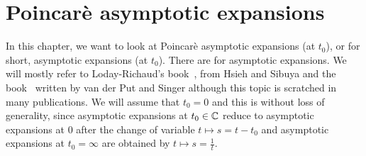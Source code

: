\chapter{Poincarè asymptotic expansions}
\begin{comment}
  \begin{multicols}{2}
    ´classical'
    \begin{itemize}
      \item \cite[60]{sabbah_cimpa90} Chapter II.2.2
        \begin{itemize}
          \item \cite{sabbah2000equations}
        \end{itemize}
      \item \textbf{\textcolor{blue}{Van der Put:
        \cite[Chapter 7]{van2003galois}: Exact Asymptotics}}
      \item \cite{majima1984asymptotic}
      \item \cite[Sec.4.4]{Balser2000Formal}
      \item \cite{Loday1994}
      \item \textbf{\textcolor{blue}{\cite{Loday2014} Chapter 2}}
      \item \cite{hsieh2012basic}
    \end{itemize}
    \columnbreak
    ´sheafical'
    \begin{itemize}
      \item \textbf{\textcolor{red}{\cite[II.5]{sabbah2007isomonodromic}}}
    \end{itemize}
  \end{multicols}
  \TODO[\cite{sibuya1990Linear} Appendix A.3]
\end{comment}
In this chapter, we want to look at Poincarè asymptotic expansions (at $t_0$),
or for short, asymptotic expansions (at $t_0$).
There are  for asymptotic expansions.
We will mostly refer to Loday-Richaud's book~\cite[chapter 2]{Loday2014},
\cite[XI-1-13]{hsieh2012basic} from Hsieh and Sibuya and the
book~\cite[chapter 7]{van2003galois} written by van der Put and Singer although
this topic is scratched in many publications.
We will assume that $t_0=0$ and this is without loss of generality, since
asymptotic expansions at $t_0\in\mathbb{C}$ reduce to asymptotic expansions at $0$
after the change of variable $t\mapsto s=t-t_0$ and asymptotic expansions at
$t_0=\infty$ are obtained by $t\mapsto s=\frac{1}{t}$.

